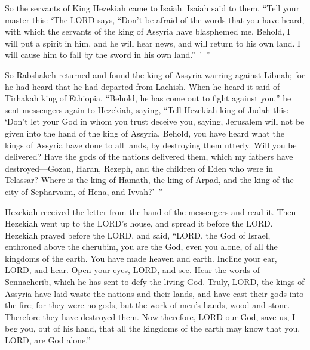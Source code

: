 \myverse{}So the servants of King Hezekiah came to Isaiah.
\myverse{}Isaiah said to them, “Tell your master this: ‘The LORD says, “Don’t be afraid
of the words that you have heard, with which the servants of the king of Assyria have blasphemed me.
\myverse{}Behold, I will put a spirit in him, and he will hear news, and will return
to his own land. I will cause him to fall by the sword in his own land.” ’ ”

\myverse{}So Rabshakeh returned and found the king of Assyria warring against
Libnah; for he had heard that he had departed from Lachish.
\myverse{}When he heard it said of Tirhakah king of Ethiopia, “Behold, he has come out
to fight against you,” he sent messengers again to Hezekiah, saying,
\myverse{}“Tell Hezekiah king of Judah this: ‘Don’t let your God in whom you trust
deceive you, saying, Jerusalem will not be given into the hand of the king of Assyria.
\myverse{}Behold, you have heard what the kings of Assyria have done to all lands,
by destroying them utterly. Will you be delivered?
\myverse{}Have the gods of the nations delivered them, which my fathers have destroyed—Gozan,
Haran, Rezeph, and the children of Eden who were in Telassar?
\myverse{}Where is the king of Hamath, the king of Arpad, and the king of the city
of Sepharvaim, of Hena, and Ivvah?’ ”

\myverse{}Hezekiah received the letter from the hand of the messengers
and read it. Then Hezekiah went up to the LORD’s house, and spread it before the LORD.
\myverse{}Hezekiah prayed before the LORD, and said, “LORD, the God of Israel, enthroned
above the cherubim, you are the God, even you alone, of all the kingdoms of the earth. You have made heaven
and earth.
\myverse{}Incline your ear, LORD, and hear. Open your eyes, LORD, and see. Hear the
words of Sennacherib, which he has sent to defy the living God.
\myverse{}Truly, LORD, the kings of Assyria have laid waste the nations and their lands,
\myverse{}and have cast their gods into the fire; for they were no gods, but the work
of men’s hands, wood and stone. Therefore they have destroyed them.
\myverse{}Now therefore, LORD our God, save us, I beg you, out of his hand, that all
the kingdoms of the earth may know that you, LORD, are God alone.”

